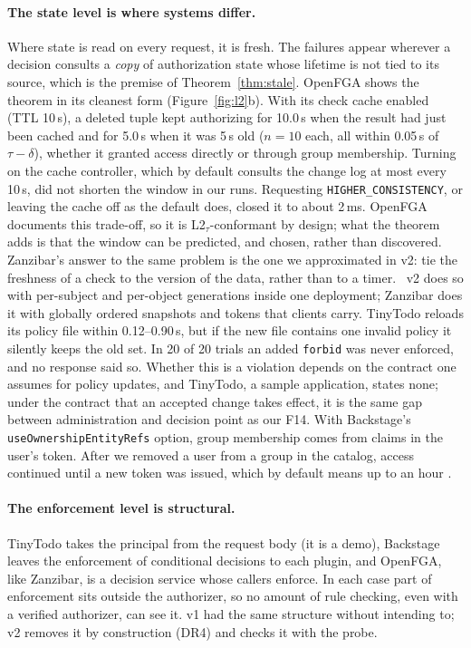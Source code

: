 \paragraph{The state level is where systems differ.} Where state is read on every request, it is fresh. The
failures appear wherever a decision consults a \emph{copy} of authorization state whose lifetime is not tied to
its source, which is the premise of Theorem~\ref{thm:stale}. OpenFGA shows the theorem in its cleanest form
(Figure~\ref{fig:l2}b). With its check cache enabled (TTL 10\,s), a deleted tuple kept authorizing for 10.0\,s when
the result had just been cached and for 5.0\,s when it was 5\,s old ($n=10$ each, all within 0.05\,s of
$\tau-\delta$), whether it granted access directly or through group membership. Turning on the cache controller,
which by default consults the change log at most every 10\,s, did not shorten the window in our runs. Requesting
\texttt{HIGHER\_CONSISTENCY}, or leaving the cache off as the default does, closed it to about 2\,ms. OpenFGA
documents this trade-off, so it is L2$_\tau$-conformant by design; what the theorem adds is that the window can
be predicted, and chosen, rather than discovered. Zanzibar's answer to the same problem is the one we
approximated in v2: tie the freshness of a check to the version of the data, rather than to a timer.
\sysname~v2 does so with per-subject and per-object generations inside one deployment; Zanzibar does it with
globally ordered snapshots and tokens that clients carry. TinyTodo reloads its policy file within 0.12--0.90\,s,
but if the new file contains one invalid policy it silently keeps the old set. In 20 of 20 trials an added
\texttt{forbid} was never enforced, and no response said so. Whether this is a violation depends on the
contract one assumes for policy updates, and TinyTodo, a sample application, states none; under the contract
that an accepted change takes effect, it is the same gap between administration and decision point as our F14. With Backstage's \texttt{useOwnershipEntityRefs} option, group membership comes from
claims in the user's token. After we removed a user from a group in the catalog, access continued until a new
token was issued, which by default means up to an hour \cite{backstageauth}.

\paragraph{The enforcement level is structural.} TinyTodo takes the principal from the request body (it is a
demo), Backstage leaves the enforcement of conditional decisions to each plugin, and OpenFGA, like Zanzibar, is a
decision service whose callers enforce. In each case part of enforcement sits outside the authorizer, so no
amount of rule checking, even with a verified authorizer, can see it. \sysname v1 had the same structure without
intending to; v2 removes it by construction (DR4) and checks it with the probe.

